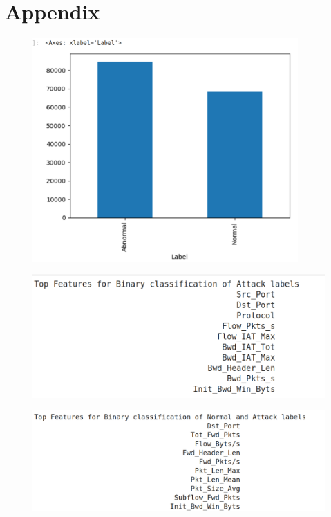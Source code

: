 \chapter*{Appendix}
\begin{figure}[tbh]
	\begin{center}
		\includegraphics[width=4in]{images/binvattlab.png}
	\end{center}
\end{figure}
\begin{figure}[tbh]
	\begin{center}
		\includegraphics[width=5in]{images/attlab.png}
	\end{center}
\end{figure}
\begin{figure}[tbh]
	\begin{center}
		\includegraphics[width=6in]{images/top10normatt.png}
	\end{center}
\end{figure}
